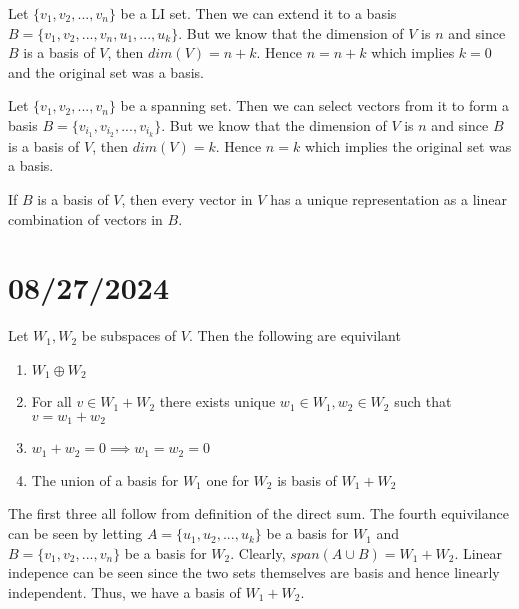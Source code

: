 \documentclass{report}
\begin{document}

\begin{myproof}
    Let $\{v_1, v_2, ..., v_n\}$ be a LI set. Then we can extend it to a basis $B = \{v_1, v_2, ..., v_n, u_1, ..., u_k\}$. But we know that the dimension of $V$ is $n$ and since $B$ is a basis of $V$, then $dim(V) = n+k$. Hence $n = n+k$ which implies $k = 0$ and the original set was a basis. 
\end{myproof}

\begin{myproof}
    Let $\{v_1, v_2, ..., v_n\}$ be a spanning set. Then we can select vectors from it to form a basis $B = \{v_{i_1}, v_{i_2}, ..., v_{i_k} \}$. But we know that the dimension of $V$ is $n$ and since $B$ is a basis of $V$, then $dim(V) = k$. Hence $n = k$ which implies the original set was a basis.
\end{myproof}
If $B$ is a basis of $V$, then every vector in $V$ has a unique representation as a linear combination of vectors in $B$. 
\section{08/27/2024}
Let $W_1, W_2$ be subspaces of $V$. Then the following are equivilant 
\begin{enumerate}
    \item $W_1 \oplus W_2$
    \item For all $v\in W_1 + W_2$ there exists unique $w_1 \in W_1, w_2 \in W_2$ such that $v = w_1 + w_2$
    \item $w_1 + w_2 = 0 \implies w_1 = w_2 = 0$
    \item The union of a basis for $W_1$ one for $W_2$ is basis of $W_1 + W_2$
\end{enumerate}

\begin{myproof}
    The first three all follow from definition of the direct sum. The fourth equivilance can be seen by letting $A = \{u_1, u_2, ..., u_k\}$ be a basis for $W_1$ and $B = \{v_1, v_2, ..., v_n\}$ be a basis for $W_2$. Clearly, $span(A\cup B) = W_1+W_2$. Linear indepence can be seen since the two sets themselves are basis and hence linearly independent. Thus, we have a basis of $W_1 + W_2$. 
\end{myproof}
\end{document}
